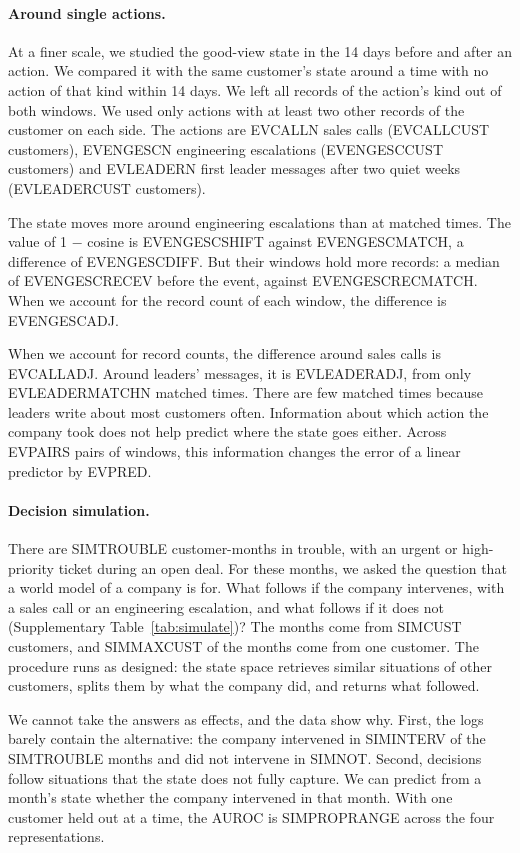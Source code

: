 \documentclass[11pt]{article}
\begin{document}
\paragraph{Around single actions.} At a finer scale, we studied the good-view state in the 14 days before and after an action. We compared it with the same customer's state around a time with no action of that kind within 14 days. We left all records of the action's kind out of both windows. We used only actions with at least two other records of the customer on each side. The actions are EVCALLN sales calls (EVCALLCUST customers), EVENGESCN engineering escalations (EVENGESCCUST customers) and EVLEADERN first leader messages after two quiet weeks (EVLEADERCUST customers).

The state moves more around engineering escalations than at matched times. The value of 1 $-$ cosine is EVENGESCSHIFT against EVENGESCMATCH, a difference of EVENGESCDIFF. But their windows hold more records: a median of EVENGESCRECEV before the event, against EVENGESCRECMATCH. When we account for the record count of each window, the difference is EVENGESCADJ.

When we account for record counts, the difference around sales calls is EVCALLADJ. Around leaders' messages, it is EVLEADERADJ, from only EVLEADERMATCHN matched times. There are few matched times because leaders write about most customers often. Information about which action the company took does not help predict where the state goes either. Across EVPAIRS pairs of windows, this information changes the error of a linear predictor by EVPRED.

\paragraph{Decision simulation.} There are SIMTROUBLE customer-months in trouble, with an urgent or high-priority ticket during an open deal. For these months, we asked the question that a world model of a company is for. What follows if the company intervenes, with a sales call or an engineering escalation, and what follows if it does not (Supplementary Table~\ref{tab:simulate})? The months come from SIMCUST customers, and SIMMAXCUST of the months come from one customer. The procedure runs as designed: the state space retrieves similar situations of other customers, splits them by what the company did, and returns what followed.

We cannot take the answers as effects, and the data show why. First, the logs barely contain the alternative: the company intervened in SIMINTERV of the SIMTROUBLE months and did not intervene in SIMNOT. Second, decisions follow situations that the state does not fully capture. We can predict from a month's state whether the company intervened in that month. With one customer held out at a time, the AUROC is SIMPROPRANGE across the four representations.
\end{document}
